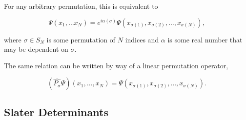     For any arbitrary permutation, this is equivalent to 
    
    \begin{equation}
        \Psi(x_1, \dots x_N) 
        =
        e^{i\alpha(\sigma)}\Psi(x_{\sigma(1)}, x_{\sigma(2)}, \dots, x_{\sigma(N)}),
    \end{equation}

    where $\sigma \in S_N$ is some permutation of $N$ indices and $\alpha$ is 
    some real number that may be dependent on $\sigma$.

    The same relation can be written by way of a linear permutation operator,

    \begin{equation}
        (\hat{P_\sigma}\Psi)(x_1, \dots, x_N)
        =
        \Psi(x_{\sigma(1)}, x_{\sigma(2)}, \dots, x_{\sigma(N)}).
    \end{equation}
    
    \subsection{Slater Determinants}